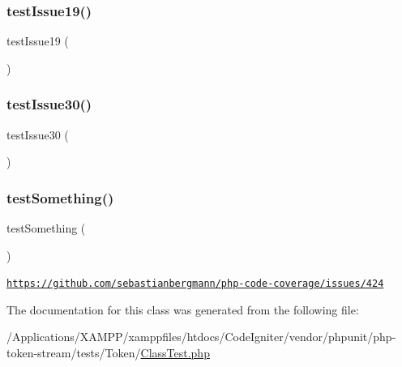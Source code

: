 \subsubsection{\texorpdfstring{test\+Issue19()}{testIssue19()}}
{\footnotesize\ttfamily test\+Issue19 (\begin{DoxyParamCaption}{ }\end{DoxyParamCaption})}

\mbox{\label{class_p_h_p___token___class_test_abe90bed5eaa0306aeb76a65e79996f17}} 
\subsubsection{\texorpdfstring{test\+Issue30()}{testIssue30()}}
{\footnotesize\ttfamily test\+Issue30 (\begin{DoxyParamCaption}{ }\end{DoxyParamCaption})}

\mbox{\label{class_p_h_p___token___class_test_a0fc4e17369bc9607ebdd850d9eda8167}} 
\subsubsection{\texorpdfstring{test\+Something()}{testSomething()}}
{\footnotesize\ttfamily test\+Something (\begin{DoxyParamCaption}{ }\end{DoxyParamCaption})}

\href{https://github.com/sebastianbergmann/php-code-coverage/issues/424}{\tt https\+://github.\+com/sebastianbergmann/php-\/code-\/coverage/issues/424} 

The documentation for this class was generated from the following file\+:\begin{DoxyCompactItemize}
\item 
/\+Applications/\+X\+A\+M\+P\+P/xamppfiles/htdocs/\+Code\+Igniter/vendor/phpunit/php-\/token-\/stream/tests/\+Token/\mbox{\hyperlink{_class_test_8php}{Class\+Test.\+php}}\end{DoxyCompactItemize}
